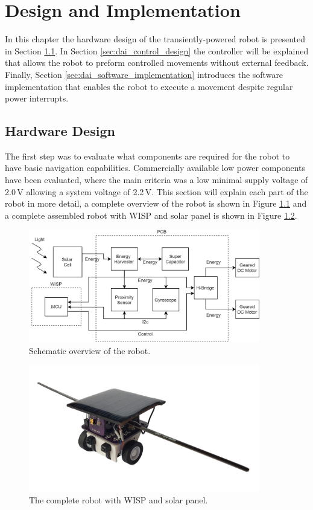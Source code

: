 \chapter{Design and Implementation}

In this chapter the hardware design of the transiently-powered robot is presented in Section \ref{sec:dai_hardware_design}.
In Section \ref{sec:dai_control_design} the controller will be explained that allows the robot to preform controlled movements without external feedback.
Finally, Section \ref{sec:dai_software_implementation} introduces the software implementation that enables the robot to execute a movement despite regular power interrupts. 

\section{Hardware Design}
\label{sec:dai_hardware_design}
The first step was to evaluate what components are required for the robot to have basic navigation capabilities.
Commercially available low power components have been evaluated, where the main criteria was a low minimal supply voltage of 2.0\,V allowing a system voltage of 2.2\,V.
This section will explain each part of the robot in more detail, a complete overview of the robot is shown in Figure \ref{fig:robot_overview} and a complete assembled robot with WISP and solar panel is shown in Figure \ref{fig:robot_picture}.

\vspace{1em}
\begin{figure}[h!]
	\centering
	\includegraphics[width=0.9\textwidth]{pics/schematic_robot_v2.png}
	\caption{Schematic overview of the robot.}
	\label{fig:robot_overview}
\end{figure}

\begin{figure}[h!]
	\centering
	\includegraphics[width=0.9\textwidth]{pics/tp_robot.png}
	\caption{The complete robot with WISP and solar panel.}
	\label{fig:robot_picture}
\end{figure}

